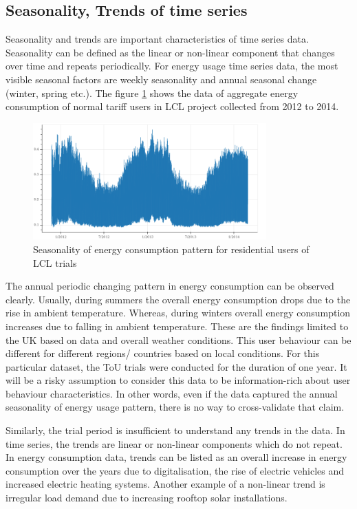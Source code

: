 \subsection{Seasonality, Trends of time series}

Seasonality and trends are important characteristics of time series data. Seasonality can be defined as the linear or non-linear component that changes over time and repeats periodically. For energy usage time series data, the most visible seasonal factors are weekly seasonality and annual seasonal change (winter, spring etc.). The figure \ref{fig:seasonality} shows the data of aggregate energy consumption of normal tariff users in LCL project collected from 2012 to 2014.

\begin{figure}[h]
    \includegraphics[width=0.8\textwidth]{img/timeseries-seasonality.png}
    \centering
    \caption{Seasonality of energy consumption pattern for residential users of LCL trials}
    \label{fig:seasonality}
\end{figure}

The annual periodic changing pattern in energy consumption can be observed clearly. Usually, during summers the overall energy consumption drops due to the rise in ambient temperature. Whereas, during winters overall energy consumption increases due to falling in ambient temperature. These are the findings limited to the UK based on data and overall weather conditions. This user behaviour can be different for different regions/ countries based on local conditions. For this particular dataset, the ToU trials were conducted for the duration of one year. It will be a risky assumption to consider this data to be information-rich about user behaviour characteristics. In other words, even if the data captured the annual seasonality of energy usage pattern, there is no way to cross-validate that claim.

Similarly, the trial period is insufficient to understand any trends in the data. In time series, the trends are linear or non-linear components which do not repeat. In energy consumption data, trends can be listed as an overall increase in energy consumption over the years due to digitalisation, the rise of electric vehicles and increased electric heating systems. Another example of a non-linear trend is irregular load demand due to increasing rooftop solar installations.

